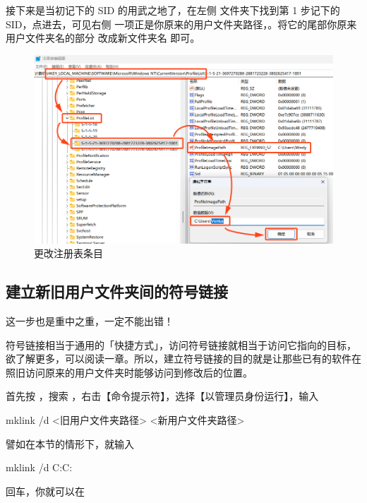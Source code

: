 {{{{接下来是当初记下的 SID 的用武之地了，在左侧  文件夹下找到第 1 步记下的 SID，点进去，可见右侧  一项正是你原来的用户文件夹路径，。将它的尾部你原来用户文件夹名的部分  改成新文件夹名  即可。

\begin{figure}[htb!]
  \centering
  \includegraphics[width=.7\textwidth]{assets/advanced/Change_Reg.png}
  \caption{更改注册表条目}
  \label{fig:Change_Reg}
\end{figure}

\subsection{建立新旧用户文件夹间的符号链接}

\begin{danger}
  这一步也是重中之重，一定不能出错！
\end{danger}

符号链接相当于通用的「快捷方式」，访问符号链接就相当于访问它指向的目标，欲了解更多，可以阅读一章。所以，建立符号链接的目的就是让那些已有的软件在照旧访问原来的用户文件夹时能够访问到修改后的位置。

首先按 ，搜索 ，右击【命令提示符】，选择【以管理员身份运行】，输入
\begin{MissingVerbatim}
  mklink /d <旧用户文件夹路径> <新用户文件夹路径>
\end{MissingVerbatim}
譬如在本节的情形下，就输入
\begin{MissingVerbatim}
  mklink /d C:\Users\Windy C:\Users\Ventus
\end{MissingVerbatim}
回车，你就可以在 }}}}
